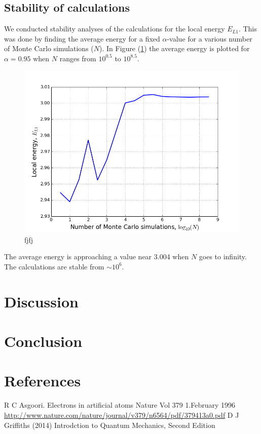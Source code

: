 \documentclass[norsk,a4paper,12pt]{article}
\begin{document}
\subsection{Stability of calculations}
We conducted stability analyses of the calculations for the local energy $E_{L1}$. This was done by finding the average energy for a fixed $\alpha$-value for a various number of Monte Carlo simulations ($N$). In Figure (\ref{fig:stability}) the average energy is plotted for $\alpha=0.95$ when $N$ ranges from $10^{0.5}$ to $10^{8.5}$.
\begin{figure} [H]
    \centering
    \includegraphics[width=12cm]{E_L1_alpha=0_95_stability.png}
    \caption{fjfj}
    \label{fig:stability}
\end{figure}
The average energy is approaching a value near 3.004 when $N$ goes to infinity. The calculations are stable from $\sim10^6$. 

\section{Discussion}
\section{Conclusion}

\newpage
\section{References}
\begingroup
\renewcommand{\section}[2]{}
\begin{thebibliography}{}
  R C Asgoori. 
  Electrons in artificial atoms
  Nature Vol 379 1.February 1996
  \url{http://www.nature.com/nature/journal/v379/n6564/pdf/379413a0.pdf}
  D J Griffiths (2014)
  Introdction to Quantum Mechanics, Second Edition
  
  

\end{thebibliography}
\end{document}
